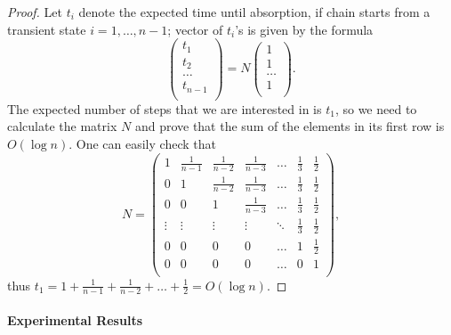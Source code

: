 \documentclass[a4paper,USenglish]{socg-lipics-v2018}
\newcommand{\eps}{\epsilon}
\newcommand{\dist}{\delta}
\begin{document}
\begin{proof}
Let $t_i$ denote the expected time
until absorption, if chain starts from a transient state $i = 1, \dots, n-1$; 
vector of $t_i$'s is given by the formula
\[
\begin{pmatrix}
      t_1 \\
      t_2 \\
      \dots \\
      t_{n-1} \\
      \end{pmatrix}
= N \begin{pmatrix}
      1 \\
      1 \\
      \dots \\
      1 \\
      \end{pmatrix}.
\]
The expected number of steps that we are interested in is $t_1$, so we need to calculate the matrix $N$
and prove that the sum of the elements in its first row is $O(\log n)$.
One can easily check that
\[
N  =  \begin{pmatrix}
      1 & \frac{1}{n-1} & \frac{1}{n-2} & \frac{1}{n-3} & \dots  & \frac{1}{3} & \frac{1}{2} \\
      0 &             1 & \frac{1}{n-2} & \frac{1}{n-3} & \dots  & \frac{1}{3} & \frac{1}{2} \\
      0 &             0 &            1  & \frac{1}{n-3} & \dots  & \frac{1}{3} & \frac{1}{2} \\
 \vdots &        \vdots &  \vdots       & \vdots        & \ddots & \frac{1}{3} & \frac{1}{2} \\
      0 &             0 &            0  &            0  &  \dots &            1 & \frac{1}{2} \\
      0 &             0 &            0  &            0  &  \dots &            0 &           1 \\
      \end{pmatrix},
\]
thus $t_1 = 1 + \frac{1}{n-1} + \frac{1}{n-2} + \dots + \frac{1}{2} = O(\log n)$.
\end{proof}

\paragraph{Experimental Results}



\end{document}
